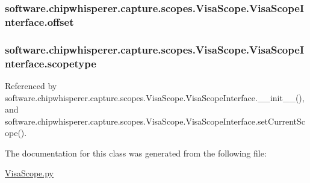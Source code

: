 \subsubsection[{offset}]{\setlength{\rightskip}{0pt plus 5cm}software.\+chipwhisperer.\+capture.\+scopes.\+Visa\+Scope.\+Visa\+Scope\+Interface.\+offset}\label{classsoftware_1_1chipwhisperer_1_1capture_1_1scopes_1_1VisaScope_1_1VisaScopeInterface_a9177aa778506d585aea4a57ea3fd8896}
\hypertarget{classsoftware_1_1chipwhisperer_1_1capture_1_1scopes_1_1VisaScope_1_1VisaScopeInterface_aece91f171885b082ccbfe991b42ee053}{}
\subsubsection[{scopetype}]{\setlength{\rightskip}{0pt plus 5cm}software.\+chipwhisperer.\+capture.\+scopes.\+Visa\+Scope.\+Visa\+Scope\+Interface.\+scopetype}\label{classsoftware_1_1chipwhisperer_1_1capture_1_1scopes_1_1VisaScope_1_1VisaScopeInterface_aece91f171885b082ccbfe991b42ee053}


Referenced by software.\+chipwhisperer.\+capture.\+scopes.\+Visa\+Scope.\+Visa\+Scope\+Interface.\+\_\+\+\_\+init\+\_\+\+\_\+(), and software.\+chipwhisperer.\+capture.\+scopes.\+Visa\+Scope.\+Visa\+Scope\+Interface.\+set\+Current\+Scope().



The documentation for this class was generated from the following file\+:\begin{DoxyCompactItemize}
\item 
\hyperlink{VisaScope_8py}{Visa\+Scope.\+py}\end{DoxyCompactItemize}
